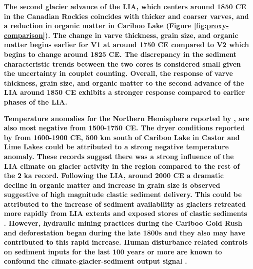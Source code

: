 \documentclass[Royal,times,doublespace,sageh]{sagej}
\begin{document}
\textbf{The second glacier advance of the LIA, which centers around 1850
CE in the Canadian Rockies \citep{Luckman2000g, Leonard1997} coincides
with thicker and coarser varves, and a reduction in organic matter in
Cariboo Lake (Figure \ref{fig:proxy-comparison}). The change in varve
thickness, grain size, and organic matter begins earlier for V1 at
around 1750 CE compared to V2 which begins to change around 1825 CE. The
discrepancy in the sediment characteristic trends between the two cores
is considered small given the uncertainty in couplet counting. Overall,
the response of varve thickness, grain size, and organic matter to the
second advance of the LIA around 1850 CE exhibits a stronger response
compared to earlier phases of the LIA.}

\textbf{Temperature anomalies for the Northern Hemisphere reported by
\citet{Moberg2005}, are also most negative from 1500-1750 CE. The dryer
conditions reported by \citet{Steinman2012} from 1600-1900 CE, 500 km
south of Cariboo Lake in Castor and Lime Lakes could be attributed to a
strong negative temperature anomaly. These records suggest there was a
strong influence of the LIA climate on glacier activity in the region
compared to the rest of the 2 ka record. Following the LIA, around 2000
CE a dramatic decline in organic matter and increase in grain size is
observed suggestive of high magnitude clastic sediment delivery. This
could be attributed to the increase of sediment availability as glaciers
retreated more rapidly from LIA extents and exposed stores of clastic
sediments \citep{Beedle2015}. However, hydraulic mining practices during
the Cariboo Gold Rush and deforestation began during the late 1800s and
they also may have contributed to this rapid increase. Human disturbance
related controls on sediment inputs for the last 100 years or more are
known to confound the climate-glacier-sediment output signal
\citep{Beedle2015}.}
\end{document}
